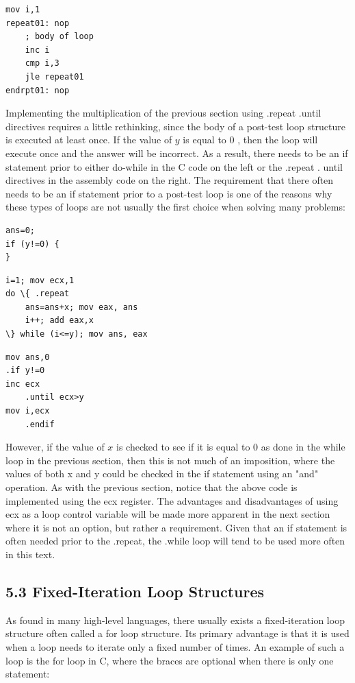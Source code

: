 \documentclass[10pt]{article}
\begin{document}
\begin{verbatim}
mov i,1
repeat01: nop
    ; body of loop
    inc i
    cmp i,3
    jle repeat01
endrpt01: nop
\end{verbatim}

Implementing the multiplication of the previous section using .repeat .until directives requires a little rethinking, since the body of a post-test loop structure is executed at least once. If the value of $y$ is equal to 0 , then the loop will execute once and the answer will be incorrect. As a result, there needs to be an if statement prior to either do-while in the C code on the left or the .repeat . until directives in the assembly code on the right. The requirement that there often needs to be an if statement prior to a post-test loop is one of the reasons why these types of loops are not usually the first choice when solving many problems:

\begin{verbatim}
ans=0;
if (y!=0) {
}
\end{verbatim}

\begin{verbatim}
i=1; mov ecx,1
do \{ .repeat
    ans=ans+x; mov eax, ans
    i++; add eax,x
\} while (i<=y); mov ans, eax
\end{verbatim}

\begin{verbatim}
mov ans,0
.if y!=0
inc ecx
    .until ecx>y
mov i,ecx
    .endif
\end{verbatim}

However, if the value of $x$ is checked to see if it is equal to 0 as done in the while loop in the previous section, then this is not much of an imposition, where the values of both x and y could be checked in the if statement using an "and" operation. As with the previous section, notice that the above code is implemented using the ecx register. The advantages and disadvantages of using ecx as a loop control variable will be made more apparent in the next section where it is not an option, but rather a requirement. Given that an if statement is often needed prior to the .repeat, the .while loop will tend to be used more often in this text.

\subsection*{5.3 Fixed-Iteration Loop Structures}
As found in many high-level languages, there usually exists a fixed-iteration loop structure often called a for loop structure. Its primary advantage is that it is used when a loop needs to iterate only a fixed number of times. An example of such a loop is the for loop in C, where the braces are optional when there is only one statement:
\end{document}

